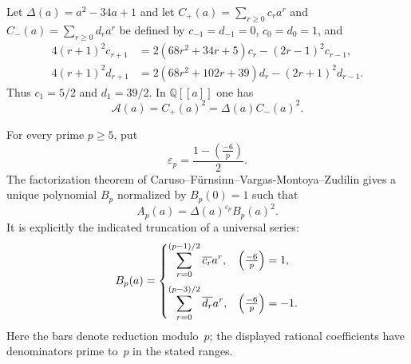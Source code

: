 \begin{proposition}
\label{prop:hasse-apery-square-roots}
Let $\Delta(a)=a^2-34a+1$ and let $C_+(a)=\sum_{r\geq0}c_ra^r$ and
$C_-(a)=\sum_{r\geq0}d_ra^r$ be defined by $c_{-1}=d_{-1}=0$,
$c_0=d_0=1$, and
\begin{align}
 4(r+1)^2c_{r+1}
 &=2(68r^2+34r+5)c_r-(2r-1)^2c_{r-1},
 \label{eq:hasse-square-root-plus}\\
 4(r+1)^2d_{r+1}
 &=2(68r^2+102r+39)d_r-(2r+1)^2d_{r-1}.
 \label{eq:hasse-square-root-minus}
\end{align}
Thus $c_1=5/2$ and $d_1=39/2$.  In $\mathbb Q[[a]]$ one has
\begin{equation}
 \mathcal A(a)=C_+(a)^2=\Delta(a)C_-(a)^2.
 \label{eq:hasse-universal-square-roots}
\end{equation}

For every prime $p\geq5$, put
\[
 \varepsilon_p=\frac{1-\left(\frac{-6}{p}\right)}2.
\]
The factorization theorem of
Caruso--F\"urnsinn--Vargas-Montoya--Zudilin
\cite[Theorem~1.2]{CFVZ2026} gives a unique polynomial $B_p$ normalized by
$B_p(0)=1$ such that
\begin{equation}
 A_p(a)=\Delta(a)^{\varepsilon_p}B_p(a)^2.
 \label{eq:hasse-CFVZ-factorization}
\end{equation}
It is explicitly the indicated truncation of a universal series:
\begin{equation}
 B_p(a)=
 \begin{cases}
  \displaystyle\sum_{r=0}^{(p-1)/2}\overline{c_r}a^r,
   &\left(\frac{-6}{p}\right)=1,\medskip\\
  \displaystyle\sum_{r=0}^{(p-3)/2}\overline{d_r}a^r,
   &\left(\frac{-6}{p}\right)=-1.
 \end{cases}
 \label{eq:hasse-square-root-truncations}
\end{equation}
Here the bars denote reduction modulo~$p$; the displayed rational
coefficients have denominators prime to~$p$ in the stated ranges.
\end{proposition}

